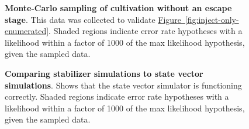 \documentclass[onecolumn,unpublished,a4paper]{quantumarticle}
\theoremstyle{definition}
\newcommand{\fig}[1]{\hyperref[fig:#1]{Figure~\ref*{fig:#1}}}
\begin{document}
\begin{figure}
    \begin{adjustwidth}{-2.5cm}{-2.5cm}
        \centering
    \end{adjustwidth}
    \caption{
        \textbf{Monte-Carlo sampling of cultivation without an escape stage}.
        This data was collected to validate \fig{inject-only-enumerated}.
        Shaded regions indicate error rate hypotheses with a likelihood within a factor of 1000 of the max likelihood hypothesis, given the sampled data.
    }
    \label{fig:inject-only-sampled}
\end{figure}

\begin{figure}
    \begin{adjustwidth}{-2.5cm}{-2.5cm}
        \centering
    \end{adjustwidth}
    \caption{
        \textbf{Comparing stabilizer simulations to state vector simulations}.
        Shows that the state vector simulator is functioning correctly.
        Shaded regions indicate error rate hypotheses with a likelihood within a factor of 1000 of the max likelihood hypothesis, given the sampled data.
    }
    \label{fig:vec-vs-stabilizer}
\end{figure}
\end{document}
